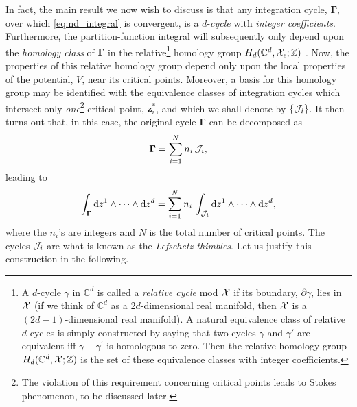 \documentclass[11pt,a4paper]{article}
\newcommand{\CJ}{{\cal J}}
\newcommand{\CX}{{\cal X}}
\def\BZ{{\mathbb Z}}
\def\BC{{\mathbb C}}
\newcommand{\be}{\begin{equation}}
\newcommand{\ee}{\end{equation}}
\newcommand{\rmd}{{\mathrm{d}}}
\begin{document}
In fact, the main result we now wish to discuss is that any integration cycle, $\boldsymbol{\Gamma}$, over which \eqref{eq:nd_integral} is convergent, is a $d$-\textit{cycle} with \textit{integer coefficients}. Furthermore, the partition-function integral will subsequently only depend upon the \textit{homology class} of $\boldsymbol{\Gamma}$ in the relative\footnote{A $d$-cycle $\gamma$ in $\mathbb C^d$ is called a \textit{relative cycle} mod $\CX$ if its boundary, $\partial \gamma$, lies in $\CX$ (if we think of $\BC^d$ as a $2d$-dimensional real manifold, then $\CX$ is a $(2d-1)$-dimensional real manifold). A natural equivalence class of relative $d$-cycles is simply constructed by saying that two cycles $\gamma$ and $\gamma'$ are equivalent iff $\gamma-\gamma^{\prime}$ is homologous to zero. Then the relative homology group $H_d (\BC^d, \CX; \BZ )$ is the set of these equivalence classes with integer coefficients.} homology group $H_d ( \BC^d, \CX_\epsilon; \BZ )$ \cite{p83, f77, w10a}. Now, the properties of this relative homology group depend only upon the local properties of the potential, $V$, near its critical points. Moreover, a basis for this homology group may be identified with the equivalence classes of integration cycles which intersect only \textit{one}\footnote{The violation of this requirement concerning critical points leads to Stokes phenomenon, to be discussed later.} critical point, $\boldsymbol{z}^*_i$, and which we shall denote by $\left\{ \CJ_i \right\}$. It then turns out that, in this case, the original cycle $\boldsymbol{\Gamma}$ can be decomposed as
%
\be
\label{eq:decompositionG}
\boldsymbol{\Gamma} = \sum_{i=1}^N n_i\, \CJ_i,
\ee
%
\noindent
leading to
%
\be
\label{eq:decompositionI}
\int_{\boldsymbol{\Gamma}} \rmd z^1 \wedge \cdots \wedge \rmd z^d = \sum_{i=1}^N n_i\, \int_{\CJ_i} \rmd z^1 \wedge \cdots \wedge \rmd z^d,
\ee
%
\noindent
where the $n_i$'s are integers and $N$ is the total number of critical points. The cycles $\CJ_i$ are what is known as the \textit{Lefschetz thimbles}. Let us justify this construction in the following.
\end{document}
